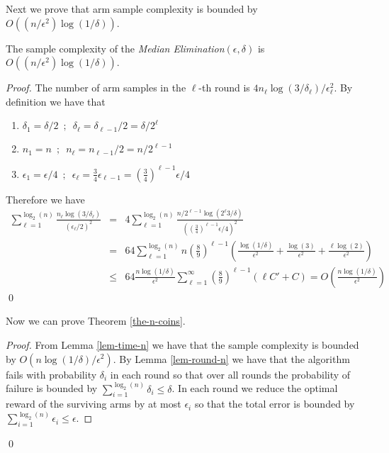 Next we prove that arm sample complexity is bounded by
$O((n/\epsilon^2) \log(1/\delta))$.

\begin{lemma}
\label{lem-time-n} The sample complexity of the {\em Median Elimination}$(\epsilon,\delta)$
is $O\left((n/\epsilon^2)\log(1/\delta)\right)$.
\end{lemma}

\begin{proof}
The number of arm samples in the $\ell$-th round is $4 n_\ell\log(3 / \delta_\ell)/\epsilon_\ell^2$. By definition we
have that
\begin{enumerate}
\item $\delta_1 = \delta /2\enspace ; \enspace \delta_\ell =
\delta_{\ell-1} / 2 = \delta / 2^\ell$ \item $n_1 = n \enspace ;
\enspace n_\ell = n_{\ell-1} / 2 = n / 2^{\ell-1}$ \item
$\epsilon_1 = \epsilon / 4 \enspace ; \enspace \epsilon_\ell =
\frac{3}{4}\epsilon_{\ell-1} =
\left(\frac{3}{4}\right)^{\ell-1}\epsilon / 4 $
\end{enumerate}
Therefore we have
\begin{eqnarray*}
\sum_{\ell=1}^{\log_2(n)}\frac{n_\ell\log(3 /
\delta_\ell)}{(\epsilon_\ell / 2)^2} & = &
4\sum_{\ell=1}^{\log_2(n)}\frac{n / 2^{\ell-1}\log(2^\ell 3/
\delta)}{((\frac{3}{4})^{\ell-1}\epsilon / 4)^2}\\
& = & 64 \sum_{\ell=1}^{\log_2(n)}
n(\frac{8}{9})^{\ell-1}(\frac{\log(1 / \delta)}{\epsilon^2} +
\frac{\log(3)}{\epsilon^2} +
\frac{\ell \log(2)}{\epsilon^2})\\
& \leq & 64 \frac{n \log(1/\delta)}{\epsilon^2} \sum_{\ell=1}^\infty
(\frac{8}{9})^{\ell-1}( \ell C' +C) = O(\frac{n\log(1
/\delta)}{\epsilon^2})
\end{eqnarray*} \qed
\end{proof}

Now we can prove Theorem \ref{the-n-coins}.

\begin{proof}
 From Lemma \ref{lem-time-n} we have that the sample complexity is
bounded by $O\left(n\log(1 /\delta)/\epsilon^2\right)$. By Lemma
\ref{lem-round-n} we have that the algorithm fails with
probability $\delta_i$ in each round so that over all rounds the
probability of failure is bounded by
$\sum_{i=1}^{\log_2(n)}\delta_i \le \delta $. In each round we
reduce the optimal reward of the surviving arms by at most
$\epsilon_i$ so that the total error is bounded by
$\sum_{i=1}^{\log_2(n)}\epsilon_i \le \epsilon$.
\end{proof} \qed

